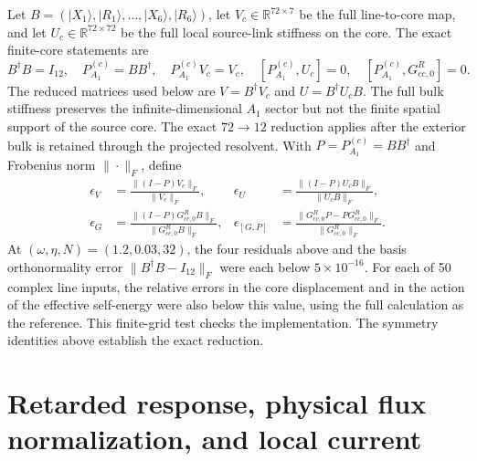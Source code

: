 \documentclass[10pt,aps,onecolumn,notitlepage,nofootinbib]{revtex4-2}
\begin{document}
Let $B=(|X_1\rangle,|R_1\rangle,\ldots,|X_6\rangle,|R_6\rangle)$, let $V_c\in\mathbb R^{72\times7}$ be the full line-to-core map, and let $U_c\in\mathbb R^{72\times72}$ be the full local source-link stiffness on the core.  The exact finite-core statements are
\begin{equation}
 B^{\dagger}B=I_{12},
 \quad P_{A_1}^{(c)}=BB^{\dagger},
 \quad P_{A_1}^{(c)}V_c=V_c,
 \quad [P_{A_1}^{(c)},U_c]=0,
 \quad [P_{A_1}^{(c)},G_{cc,0}^R]=0.
\end{equation}
The reduced matrices used below are $V=B^\dagger V_c$ and $U=B^\dagger U_cB$. The full bulk stiffness preserves the infinite-dimensional $A_1$ sector but not the finite spatial support of the source core. The exact $72\to12$ reduction applies after the exterior bulk is retained through the projected resolvent. With $P=P_{A_1}^{(c)}=BB^\dagger$ and Frobenius norm $\|\cdot\|_F$, define
\begin{align}
 \epsilon_V&=\frac{\|(I-P)V_c\|_F}{\|V_c\|_F},
 &\epsilon_U&=\frac{\|(I-P)U_cB\|_F}{\|U_cB\|_F},\\
 \epsilon_G&=\frac{\|(I-P)G_{cc,0}^RB\|_F}{\|G_{cc,0}^RB\|_F},
 &\epsilon_{[G,P]}&=\frac{\|G_{cc,0}^RP-PG_{cc,0}^R\|_F}{\|G_{cc,0}^R\|_F}.
\end{align}
At $(\omega,\eta,N)=(1.2,0.03,32)$, the four residuals above and the basis orthonormality error $\|B^\dagger B-I_{12}\|_F$ were each below $5\times10^{-16}$. For each of 50 complex line inputs, the relative errors in the core displacement and in the action of the effective self-energy were also below this value, using the full calculation as the reference. This finite-grid test checks the implementation. The symmetry identities above establish the exact reduction.

\section{Retarded response, physical flux normalization, and local current}
\end{document}
